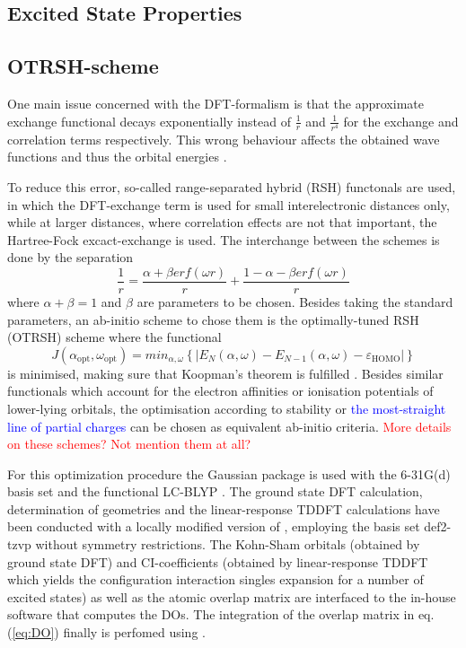 \subsection{Excited State Properties}


\subsection{OTRSH-scheme}
One main issue concerned with the DFT-formalism is that the approximate exchange functional decays exponentially instead of $\frac 1r$ and $\frac{1}{r^4}$ for the exchange and correlation terms respectively.
This wrong behaviour affects the obtained wave functions and thus the orbital energies \cite{Bokareva}.

To reduce this error, so-called range-separated hybrid (RSH) functonals are used, in which the DFT-exchange term is used for small interelectronic distances only, while at larger distances, where correlation effects are not that important, the Hartree-Fock excact-exchange is used.
The interchange between the schemes is done by the separation
\begin{equation}
   \frac 1r = \frac{\alpha +\beta erf(\omega r)}{r} +\frac{1-\alpha-\beta erf(\omega r)}{r}
\end{equation}
where $\alpha+\beta=1$ and $\beta$ are parameters to be chosen.
Besides taking the standard parameters, an ab-initio scheme to chose them is the optimally-tuned RSH (OTRSH) scheme where the functional
\begin{equation}\label{eq:J_ao}
   J(\alpha_\text{opt},\omega_\text{opt})=min_{\alpha, \omega} \left\{ |E_N(\alpha,\omega)-E_{N-1}(\alpha,\omega)-\varepsilon_\text{HOMO}| \right\}
\end{equation}
is minimised, making sure that Koopman's theorem is fulfilled \cite{Bokareva}.
Besides similar functionals which account for the electron affinities or ionisation potentials of lower-lying orbitals, the optimisation according to stability or \textcolor{blue}{the most-straight line of partial charges} can be chosen as equivalent ab-initio criteria.
\textcolor{red}{More details on these schemes? Not mention them at all?}

For this optimization procedure the Gaussian package  \cite{g09} is used with the 6-31G(d) \cite{6-31g,6-31gd} basis set and the functional LC-BLYP \cite{lcblyp}. 
The ground state DFT calculation, determination of geometries and the linear-response TDDFT calculations have been conducted with a locally modified version of  \cite{nwchem}, employing the basis set def2-tzvp \cite{def2tzvp} without symmetry restrictions.
The Kohn-Sham orbitals (obtained by ground state DFT) and CI-coefficients (obtained by linear-response TDDFT which yields the configuration interaction singles expansion for a number of excited states) as well as the atomic overlap matrix are interfaced to the in-house software  \cite{MAgg} that computes the DOs.
The integration of the overlap matrix in eq. (\ref{eq:DO}) finally is perfomed using  \cite{ezDyson}.

